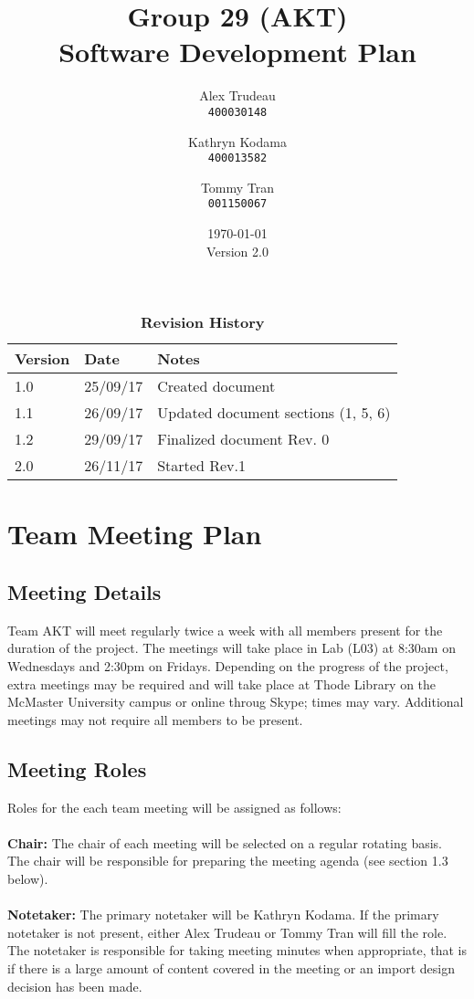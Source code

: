 \documentclass[12pt,fleqn]{article}
\title{Group 29 (AKT)\\ Software Development Plan}
\author{
Alex Trudeau\\
	\texttt{400030148}
\and
Kathryn Kodama\\
  	\texttt{400013582}
\and
Tommy Tran\\
	\texttt{001150067}
}
\date{\today\\Version 2.0}
\begin{document}
\maketitle

\pagebreak

\tableofcontents

\begin{table}[ht]
\caption{\bf Revision History}
\begin{tabularx}{\textwidth}{p{3cm}p{2cm}X}
\toprule {\bf Version} & {\bf Date} & {\bf Notes}\\
\midrule
1.0 & 25/09/17 & Created document \\
1.1 & 26/09/17 & Updated document sections (1, 5, 6) \\
1.2 & 29/09/17 & Finalized document Rev. 0 \\
2.0 & 26/11/17 & Started Rev.1 \\
\bottomrule
\end{tabularx}
\end{table}


\clearpage

\section{Team Meeting Plan}

\subsection{Meeting Details}

Team AKT will meet regularly twice a week with all members present for the duration of the project.  The meetings will take place in Lab (L03) at 8:30am on Wednesdays and 2:30pm on Fridays.  Depending on the progress of the project, extra meetings may be required and will take place at Thode Library on the McMaster University campus or online throug Skype; times may vary.  Additional meetings may not require all members to be present.

\subsection{Meeting Roles}
Roles for the each team meeting will be assigned as follows:\\ \\
\textbf{Chair:} The chair of each meeting will be selected on a regular rotating basis.  The chair will be responsible for preparing the meeting agenda (see section 1.3 below).\\ \\
\textbf{Notetaker:} The primary notetaker will be Kathryn Kodama.  If the primary notetaker is not present, either Alex Trudeau or Tommy Tran will fill the role.  The notetaker is responsible for taking meeting minutes when appropriate, that is if there is a large amount of content covered in the meeting or an import design decision has been made.  
\end{document}
